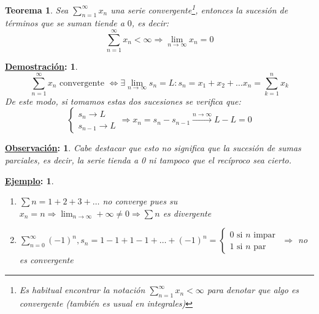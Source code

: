 \documentclass[10pt,a4paper,openright]{book}
\theoremstyle{break}
\newtheorem*{theo}{Teorema}
\newtheorem*{demo}{\underline{Demostración}:}
\newtheorem*{obs}{\underline{Observación}:}
\newtheorem*{ej}{\underline{Ejemplo}:}
\begin{document}
\begin{theo}
Sea $\sum_{n=1}^\infty x_n$ una serie convergente\footnote{Es habitual encontrar la notación $\sum_{n=1}^\infty x_n < \infty$ para denotar que algo es convergente (también es usual en integrales)}, entonces la sucesión de términos que se suman tiende a $0$, es decir:
$$\sum_{n=1}^{\infty} x_n <\infty \Rightarrow \lim_{n \rightarrow \infty} x_n =0$$
\end{theo}
\begin{demo}
$$\sum_{n=1}^{\infty} x_n \mbox{ convergente } \Leftrightarrow \exists \lim_{n \to \infty} s_n = L: s_n = x_1 + x_2 + \ldots x_n = \sum_{k=1}^{n} x_k$$
De este modo, si tomamos estas dos sucesiones se verifica que:
$$\begin{cases}s_n \to L \\ s_{n-1} \to L\end{cases} \Rightarrow x_n = s_n - s_{n-1} \xrightarrow{n\rightarrow\infty} L-L = 0$$
\end{demo}

\begin{obs}
Cabe destacar que esto no significa que la sucesión de sumas parciales, es decir, la serie tienda a 0 ni tampoco que el recíproco sea cierto.
\end{obs}

\begin{ej}
\begin{enumerate}

\item $\sum n = 1 + 2 + 3 + \ldots$ no converge pues su $x_n = n \Rightarrow \lim_{n \to \infty} +\infty \neq 0 \Rightarrow \sum n$ es divergente

\item $\sum_{n=0}^{\infty} (-1)^n , s_n = 1 - 1 + 1 - 1 + \ldots + (-1)^n = \begin{cases} 0 \mbox { si $n$ impar } \\ 1 \mbox { si $n$ par } \end{cases} \Rightarrow $ no es convergente
\end{enumerate}
\end{ej}
\end{document}
